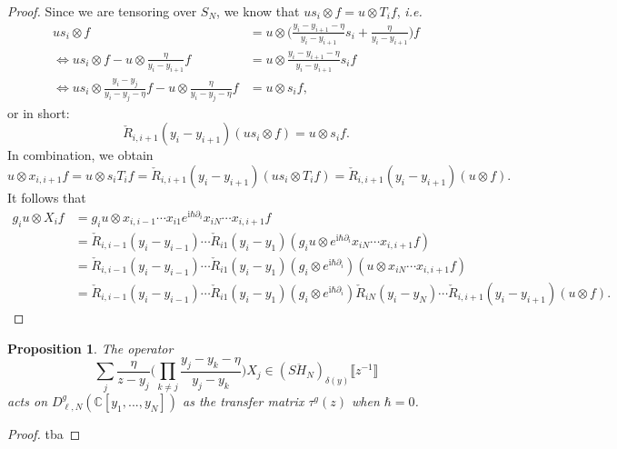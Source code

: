 \documentclass[11pt]{report}
\newtheorem{prop}[theorem]{Proposition}
\theoremstyle{definition}
\theoremstyle{remark}
\theoremstyle{remark}
\newcommand{\C}{\mathbb{C}}
\newcommand{\I}{\mathrm{i}}
\begin{document}
\begin{proof}
Since we are tensoring over $S_N$, we know that $u s_i \otimes f = u \otimes T_i f$, \emph{i.e.}
\begin{align*}
us_i  \otimes f &= u \otimes \bigg( \frac{y_i-y_{i+1}-\eta}{y_i-y_{i+1}} s_i + \frac{\eta}{y_i-y_{i+1}} \bigg) f \\
\Leftrightarrow u s_i \otimes f - u \otimes \frac{\eta}{y_i-y_{i+1}} f &= u \otimes \frac{y_i-y_{i+1}-\eta}{y_i-y_{i+1}} s_i f \\
\Leftrightarrow u s_i \otimes \frac{y_i-y_j}{y_i-y_j-\eta} f - u \otimes \frac{\eta}{y_i-y_j-\eta} f &= u \otimes s_i f,
\end{align*}
or in short:
\begin{equation*}
\check R_{i,i+1}(y_i-y_{i+1}) (u s_i \otimes f) = u \otimes s_i f.
\end{equation*}
In combination, we obtain
\begin{equation*}
u \otimes x_{i,i+1} f = u \otimes s_i T_i f = \check R_{i,i+1}(y_i-y_{i+1}) (u s_i \otimes T_i f) = \check R_{i,i+1}(y_i-y_{i+1})(u \otimes f).
\end{equation*}
It follows that
\begin{align*}
g_i u \otimes X_i f
&= g_i u \otimes x_{i,i-1} \cdots x_{i1} e^{\I \hbar \partial_i} x_{iN} \cdots x_{i,i+1} f \\
&= \check R_{i,i-1}(y_i-y_{i-1}) \cdots \check R_{i1}(y_i-y_1) (g_i u \otimes e^{\I \hbar \partial_i} x_{iN} \cdots x_{i,i+1} f) \\
&= \check R_{i,i-1}(y_i-y_{i-1}) \cdots \check R_{i1}(y_i-y_1) (g_i \otimes e^{\I \hbar \partial_i}) (u \otimes x_{iN} \cdots x_{i,i+1} f) \\
&= \check R_{i,i-1}(y_i-y_{i-1}) \cdots \check R_{i1}(y_i-y_1) (g_i \otimes e^{\I \hbar \partial_i}) \check R_{iN}(y_i-y_N) \cdots \check R_{i,i+1}(y_i-y_{i+1}) (u \otimes f).
\end{align*}
\end{proof}

\begin{prop}
The operator
\begin{equation*}
\sum_j \frac{\eta}{z-y_j} \bigg( \prod_{k \neq j} \frac{y_j-y_k-\eta}{y_j-y_k} \bigg) X_j \in (S\ddot H_N)_{\delta(y)}\llbracket z^{-1} \rrbracket
\end{equation*}
acts on $D_{\ell,N}^g(\C[y_1,...,y_N])$ as the transfer matrix $\tau^g(z)$ when $\hbar = 0$.
\end{prop}

\begin{proof}
tba
\end{proof}
\end{document}

